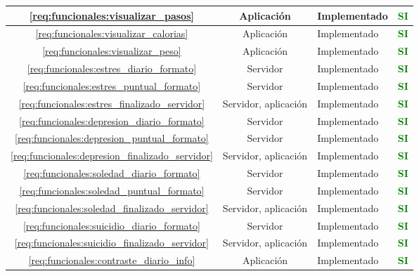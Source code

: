 \begin{xltabular}{\textwidth}{|c|c|X|c|}
        \hline
        \ref{req:funcionales:visualizar_pasos} & Aplicación & Implementado & \textcolor{green}{\textbf{SI}} \\
        \hline
        \ref{req:funcionales:visualizar_calorias} & Aplicación & Implementado & \textcolor{green}{\textbf{SI}} \\
        \hline
        \ref{req:funcionales:visualizar_peso} & Aplicación & Implementado & \textcolor{green}{\textbf{SI}} \\
        \hline
        \ref{req:funcionales:estres_diario_formato} & Servidor & Implementado & \textcolor{green}{\textbf{SI}} \\
        \hline
        \ref{req:funcionales:estres_puntual_formato} & Servidor & Implementado & \textcolor{green}{\textbf{SI}} \\
        \hline
        \ref{req:funcionales:estres_finalizado_servidor} & Servidor, aplicación & Implementado & \textcolor{green}{\textbf{SI}} \\
        \hline
        \ref{req:funcionales:depresion_diario_formato} & Servidor & Implementado & \textcolor{green}{\textbf{SI}} \\
        \hline
        \ref{req:funcionales:depresion_puntual_formato} & Servidor & Implementado & \textcolor{green}{\textbf{SI}} \\
        \hline
        \ref{req:funcionales:depresion_finalizado_servidor} & Servidor, aplicación & Implementado & \textcolor{green}{\textbf{SI}} \\
        \hline
        \ref{req:funcionales:soledad_diario_formato} & Servidor & Implementado & \textcolor{green}{\textbf{SI}} \\
        \hline
        \ref{req:funcionales:soledad_puntual_formato} & Servidor & Implementado & \textcolor{green}{\textbf{SI}} \\
        \hline
        \ref{req:funcionales:soledad_finalizado_servidor} & Servidor, aplicación & Implementado & \textcolor{green}{\textbf{SI}} \\
        \hline
        \ref{req:funcionales:suicidio_diario_formato} & Servidor & Implementado & \textcolor{green}{\textbf{SI}} \\
        \hline
        \ref{req:funcionales:suicidio_finalizado_servidor} & Servidor, aplicación & Implementado & \textcolor{green}{\textbf{SI}} \\
        \hline
        \ref{req:funcionales:contraste_diario_info} & Aplicación & Implementado & \textcolor{green}{\textbf{SI}} \\

\end{xltabular}
